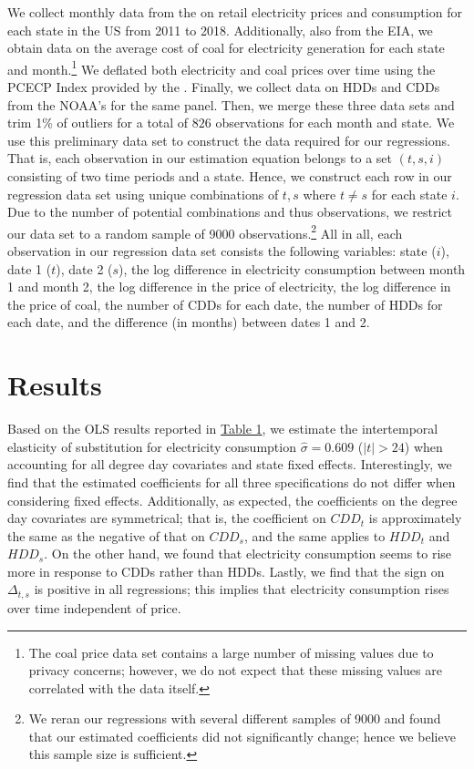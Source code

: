 \documentclass[11pt,a4paper]{extarticle}
\begin{document}
We collect monthly data from the \cite{EIANetgen} on retail electricity prices and consumption for each state in the US from 2011 to 2018. Additionally, also from the EIA, we obtain data on the average cost of coal for electricity generation for each state and month.\footnote{The coal price data set contains a large number of missing values due to privacy concerns; however, we do not expect that these missing values are correlated with the data itself.} We deflated both electricity and coal prices over time using the PCECP Index provided by the  \cite{USBEA}. 
Finally, we collect data on HDDs and CDDs from the NOAA's \citet{CPC} for the same panel. Then, we merge these three data sets and trim 1\% of outliers for a total of $826$ observations for each month and state. We use this preliminary data set to construct the data required for our regressions. That is, each observation in our estimation equation belongs to a set $(t,s,i)$ consisting of two time periods and a state. Hence, we construct each row in our regression data set using unique combinations of $t,s$ where $t \neq s$ for each state $i$. Due to the number of potential combinations and thus observations, we restrict our data set to a random sample of 9000 observations.\footnote{We reran our regressions with several different samples of 9000 and found that our estimated coefficients did not significantly change; hence we believe this sample size is sufficient.} 
All in all, each observation in our regression data set consists the following variables: state ($i$), date 1 ($t$), date 2 ($s$), the log difference in electricity consumption between month 1 and month 2, the log difference in the price of electricity, the log difference in the price of coal, the number of CDDs for each date, the number of HDDs for each date, and the difference (in months) between dates 1 and 2.  



\section{Results}

Based on the OLS results reported in \hyperref[table:1]{Table 1}, we estimate the intertemporal elasticity of substitution for electricity consumption $\hat{\sigma}  = 0.609$ ($|t| > 24$) when accounting for all degree day covariates and state fixed effects. Interestingly, we find that the estimated coefficients for all three specifications do not differ when considering fixed effects. Additionally, as expected, the coefficients on the degree day covariates are symmetrical; that is, the coefficient on $CDD_{t}$ is approximately the same as the negative of that on $CDD_{s}$, and the same applies to $HDD_{t}$ and $HDD_{s}$. On the other hand, we found that electricity consumption seems to rise more in response to CDDs rather than HDDs. Lastly, we find that the sign on $\Delta_{t,s}$ is positive in all regressions; this implies that electricity consumption rises over time independent of price. 
\end{document}
